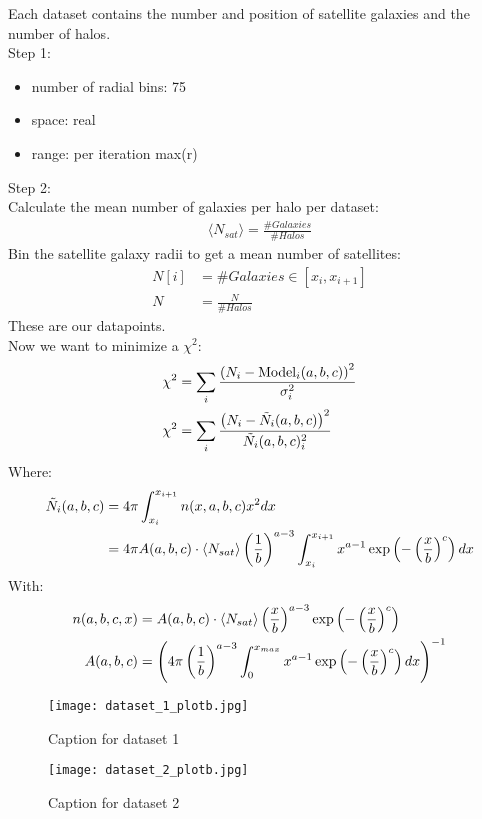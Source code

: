 Each dataset contains the number and position of satellite galaxies and the number of halos.\\
Step 1:\\
\begin{itemize}
    \item number of radial bins: 75
    \item space: real
    \item range: per iteration max(r)
\end{itemize}
Step 2: \\
Calculate the mean number of galaxies per halo per dataset:
\begin{align}
    \langle N_{sat} \rangle = \frac{\# Galaxies}{\# Halos}
\end{align}
Bin the satellite galaxy radii to get a mean number of satellites:
\begin{align}
    N[i] &= \# Galaxies \in [x_i,x_{i+1}]\\
    N &= \frac{N}{\# Halos}
\end{align}
These are our datapoints. \\
Now we want to minimize a $\chi^2$:
\begin{align}
    \chi^2 &= \sum_i \frac{\left({N_i-\text{Model}_i(a,b,c)}\right)^2}{\sigma_i^2}\\
    \chi^2 &= \sum_i \frac{\left({N_i-\Tilde{N}_i(a,b,c)}\right)^2}{\Tilde{N}_i(a,b,c)_i^2}
\end{align}
Where:
\begin{align}
    \Tilde{N}_i(a,b,c) &= 4 \pi \int_{x_i}^{x_{i+1}}n(x,a,b,c)x^2dx \\
    &= 4 \pi A(a,b,c)\cdot \langle N_{sat} \rangle \left( \frac{1}{b} \right)^{a-3}  \int_{x_i}^{x_{i+1}}x^{a-1} \exp\left({-\left( \frac{x}{b} \right)^{c}}\right) dx
\end{align}
With:
\begin{align}
    n(a,b,c,x) &= A(a,b,c)\cdot \langle N_{sat} \rangle \left( \frac{x}{b} \right)^{a-3} \exp\left({-\left( \frac{x}{b} \right)^{c}}\right)\\
    A(a,b,c) &= \left({4\pi \left( \frac{1}{b} \right)^{a-3} \int_0^{x_{max}} x^{a-1} \exp\left({-\left( \frac{x}{b} \right)^c}\right) dx}\right)^{-1}
\end{align}

\begin{figure}[h!]
    \centering
    \texttt{[image: dataset\_1\_plotb.jpg]}
    \caption{Caption for dataset 1}
\end{figure}

\begin{figure}[h!]
    \centering
    \texttt{[image: dataset\_2\_plotb.jpg]}
    \caption{Caption for dataset 2}
\end{figure}

